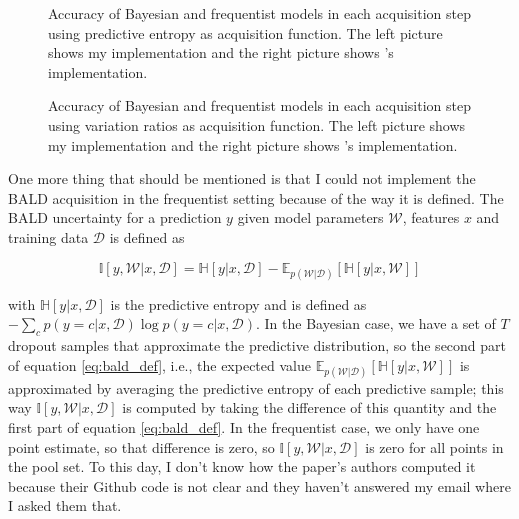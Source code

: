 \begin{figure}[H]
  \centering
  \hfill
  \caption{Accuracy of Bayesian and frequentist models in each acquisition step using predictive entropy as acquisition function. The left picture shows my implementation and the right picture shows \citeauthor{Gal2016Active}'s implementation.}
  \label{fig:pred_entropy_AL}
\end{figure}


\begin{figure}[H]
  \centering
  \hfill
  \caption{Accuracy of Bayesian and frequentist models in each acquisition step using variation ratios as acquisition function. The left picture shows my implementation and the right picture shows \citeauthor{Gal2016Active}'s implementation.}
  \label{fig:var_ratios_AL}
\end{figure}

One more thing that should be mentioned is that I could not implement the BALD acquisition in the frequentist setting because of the way it is defined. The BALD uncertainty for a prediction $y$ given model parameters $\mathcal{W}$, features $x$ and training data $\mathcal{D}$ is defined as

\begin{equation}
	\label{eq:bald_def}
	\mathbb{I}[y, \mathcal{W} | x, \mathcal{D}] = \mathbb{H}[y | x, \mathcal{D}] - \mathbb{E}_{p(\mathcal{W} | \mathcal{D})}[\mathbb{H}[y | x, \mathcal{W}]]
\end{equation}

with $\mathbb{H}[y | x, \mathcal{D}]$ is the predictive entropy and is defined as $-\sum_c p(y = c | x, \mathcal{D}) \log p(y = c | x, \mathcal{D})$. In the Bayesian case, we have a set of $T$ dropout samples that approximate the predictive distribution, so the second part of equation \ref{eq:bald_def}, i.e., the expected value $\mathbb{E}_{p(\mathcal{W} | \mathcal{D})}[\mathbb{H}[y | x, \mathcal{W}]]$ is approximated by averaging the predictive entropy of each predictive sample; this way $\mathbb{I}[y, \mathcal{W} | x, \mathcal{D}]$ is computed by taking the difference of this quantity and the first part of equation \ref{eq:bald_def}. In the frequentist case, we only have one point estimate, so that difference is zero, so $\mathbb{I}[y, \mathcal{W} | x, \mathcal{D}]$ is zero for all points in the pool set. To this day, I don't know how the paper's authors computed it because their Github code is not clear and they haven't answered my email where I asked them that.
